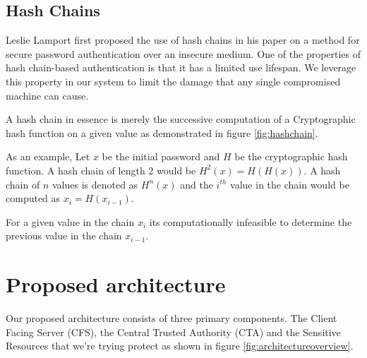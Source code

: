 \documentclass[a4paper,twoside]{article}
\begin{document}
\subsection{Hash Chains}

Leslie Lamport \cite{lamport_password_1981} first proposed the use of hash chains in his paper on a method for secure password authentication over an insecure medium.  One of the properties of hash chain-based authentication is that it has a limited use lifespan.  We leverage this property in our system to limit the damage that any single compromised machine can cause.


A hash chain in essence is merely the successive computation of a Cryptographic hash function on a given value as demonstrated in figure \ref{fig:hashchain}.

As an example, Let $x$ be the initial password and $H$ be the cryptographic hash function.  A hash chain of length 2 would be $H^{2}(x) = H(H(x))$. A hash chain of $n$ values is denoted as $H^{n}(x)$ and the $i^{th}$ value in the chain would be computed as $x_{i} = H(x_{i-1})$.

For a given value in the chain $x_{i}$ its computationally infeasible to determine the previous value in the chain $x_{i-1}$.


\section{Proposed architecture}

Our proposed architecture consists of three primary components. The Client Facing Server (CFS), the Central Trusted Authority (CTA) and the Sensitive Resources that we're trying protect as shown in figure \ref{fig:architectureoverview}. 
\end{document}
